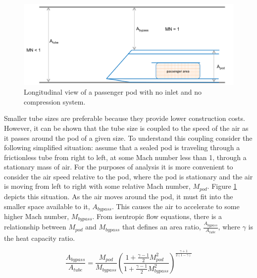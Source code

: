 \documentclass[heading.tex]{subfiles}
\begin{document}
\begin{figure}[hbtp]
\centering
\includegraphics[width=.85\textwidth]{images/podA}
\caption{Longitudinal view of a passenger pod with no inlet and no compression system.}
\label{f:ClosedPod}
\end{figure}

Smaller tube sizes are preferable because they provide lower construction costs. However, it can be shown that 
the tube size is coupled to the speed of the air as it passes around the pod of a given size. 
To understand this coupling consider the following simplified situation: assume that a sealed pod
is traveling through a frictionless tube from right to left, at some Mach number less than 1, through a stationary mass of air. 
For the purposes of analysis it is more convenient to consider the air speed relative to the pod, 
where the pod is stationary and the air is moving from left to right with some relative Mach number, $M_{pod}$. 
Figure \ref{f:ClosedPod} depicts this situation.
As the air moves around the pod, it must fit into the smaller space available to it, $A_{bypass}$.
This causes the air to accelerate to some higher Mach number, $M_{bypass}$.
From isentropic flow equations, there is a relationship between 
$M_{pod}$ and $M_{bypass}$ that defines an area ratio, $\frac{A_{bypass}}{A_{tube}}$, where $\gamma$ is the heat capacity ratio.

\begin{equation}
\frac{A_{bypass}}{A_{tube}} = \frac{M_{pod}}{M_{bypass}}
\left(\frac{1+ \frac{\gamma-1}{2} M_{pod\ \ \ }^2}
{1+ \frac{\gamma-1}{2} M_{bypass}^2}\right)^{\frac{\gamma+1}{2\left(1-\gamma\right)}}
\label{e:a-over-astar}
\end{equation}
\end{document}
